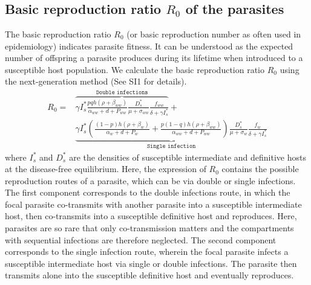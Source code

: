 \documentclass[a4paper]{scrartcl}
\providecommand{\DIFaddtex}[1]{{\protect\color{blue}\uwave{#1}}} %
\providecommand{\DIFaddend}{} %
\providecommand{\DIFadd}[1]{\texorpdfstring{\DIFaddtex{#1}}{#1}} %
\DeclareRobustCommand{\DIFaddend}{\DIFOaddend \let\includegraphics\DIFOincludegraphics} %
\begin{document}
\section*{\DIFadd{Results}}
\DIFaddend \subsection*{Basic reproduction ratio $R_0$ of the parasites}

The basic reproduction ratio $R_0$ (or basic reproduction number as often used in epidemiology) indicates parasite fitness. 
It can be understood as the expected number of offspring a parasite produces during its lifetime when introduced to a susceptible host population. 
We calculate the basic reproduction ratio $R_0$ using the next-generation method \citep{Diekmann1990, Diekmann2009, hurford:JRSI:2010} (See SI1 for details).
%
\begin{align}
R_0 = & \overbrace{\gamma I_s^* \frac{p q h (\rho +  \beta_{ww})}{\alpha_{ww} + d + P_{ww}} \frac{D_s^*}{\mu +\sigma_{ww}} \frac{f_{ww}}{\delta +\gamma I_s^*}}^{ \texttt{Double infections}} + \nonumber \\
& \underbrace{\gamma  I_s^* \left( \frac{ (1-p) h (\rho + \beta_w)}{\alpha_w + d + P_w} + \frac{p (1-q) h (\rho + \beta_{ww})}{\alpha_{ww} + d + P_{ww}} \right) \frac{D_s^*}{\mu + \sigma_w} \frac{f_w}{\delta +\gamma  I_s^*}}_{\texttt{Single infection}}
\end{align}
%
where $I_s^*$ and $D_s^*$ are the densities of susceptible intermediate and definitive hosts at the disease-free equilibrium. 
Here, the expression of $R_0$ contains the possible reproduction routes of a parasite, which can be via double or single infections. 
The first component corresponds to the double infections route, in which the focal parasite co-transmits with another parasite into a susceptible intermediate host, then co-transmits into a susceptible definitive host and reproduces. 
Here, parasites are so rare that only co-transmission matters and the compartments with sequential infections are therefore neglected. 
The second component corresponds to the single infection route, wherein the focal parasite infects a susceptible intermediate host via single or double infections. 
The parasite then transmits alone into the susceptible definitive host and eventually reproduces. 
\end{document}
